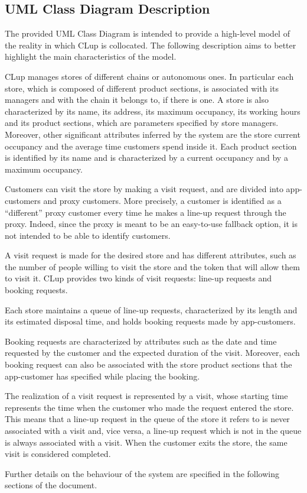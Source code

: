 \documentclass[a4paper,oneside,11pt]{book}   %
\begin{document}
    \subsection{UML Class Diagram Description}
    The provided UML Class Diagram is intended to provide a high-level model of the reality in which CLup is collocated. The following description aims to better highlight the main characteristics of the model. \par
    CLup manages stores of different chains or autonomous ones. In particular each store, which is composed of different product sections, is associated with its managers and with the chain it belongs to, if there is one. A store is also characterized by its name, its address, its maximum occupancy, its working hours and its product sections, which are parameters specified by store managers. Moreover, other significant attributes inferred by the system are the store current occupancy and the average time customers spend inside it. Each product section is identified by its name and is characterized by a current occupancy and by a maximum occupancy. \par
    Customers can visit the store by making a visit request, and are divided into app-customers and proxy customers. More precisely, a customer is identified as a “different” proxy customer every time he makes a line-up request through the proxy. Indeed, since the proxy is meant to be an easy-to-use fallback option, it is not intended to be able to identify customers. \par
    A visit request is made for the desired store and has different attributes, such as the number of people willing to visit the store and the token that will allow them to visit it. CLup provides two kinds of visit requests: line-up requests and booking requests. \par
    Each store maintains a queue of line-up requests, characterized by its length and its estimated disposal time, and holds booking requests made by app-customers. \par
    Booking requests are characterized by attributes such as the date and time requested by the customer and the expected duration of the visit. Moreover, each booking request can also be associated with the store product sections that the app-customer has specified while placing the booking. \par
    The realization of a visit request is represented by a visit, whose starting time represents the time when the customer who made the request entered the store. This means that a line-up request in the queue of the store it refers to is never associated with a visit and, vice versa, a line-up request which is not in the queue is always associated with a visit. When the customer exits the store, the same visit is considered completed. \par
    Further details on the behaviour of the system are specified in the following sections of the document.
\end{document}
